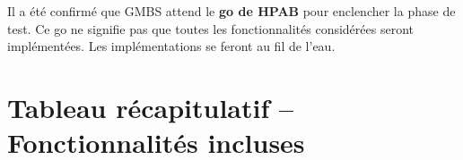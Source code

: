 \documentclass[12pt,a4paper]{article}
\begin{document}
\vspace{0.5cm}
\begin{tcolorbox}[colback=gmbs-warning!10,colframe=gmbs-warning,title={\faExclamationTriangle\ Note importante}]
Il a été confirmé que GMBS attend le \textbf{go de HPAB} pour enclencher la phase de test. Ce go ne signifie pas que toutes les fonctionnalités considérées seront implémentées. Les implémentations se feront au fil de l'eau.
\end{tcolorbox}

\section{Tableau récapitulatif – Fonctionnalités incluses}
\end{document}
